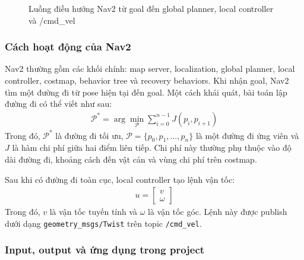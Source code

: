 \begin{figure}[H]
\centering
{}
\caption{Luồng điều hướng Nav2 từ goal đến global planner, local controller và /cmd\_vel}
\label{fig:nav2-flow}
\end{figure}

\subsubsection{Cách hoạt động của Nav2}

Nav2 thường gồm các khối chính: map server, localization, global
planner, local controller, costmap, behavior tree và recovery behaviors.
Khi nhận goal, Nav2 tìm một đường đi từ pose hiện tại đến goal. Một cách
khái quát, bài toán lập đường đi có thể viết như sau:
\begin{gather*}\mathcal{P}^{*} = \arg\min_{\mathcal{P}}\sum_{i = 0}^{n - 1}J\left( p_{i},p_{i + 1} \right)\end{gather*}
Trong đó, \(\mathcal{P}^{*}\) là đường đi tối ưu,
\(\mathcal{P} = \{p_{0},p_{1},\ldots,p_{n}\}\) là một đường đi ứng viên
và \(J\) là hàm chi phí giữa hai điểm liên tiếp. Chi phí này thường phụ
thuộc vào độ dài đường đi, khoảng cách đến vật cản và vùng chi phí trên
costmap.

Sau khi có đường đi toàn cục, local controller tạo lệnh vận tốc:
\begin{gather*}u = \begin{bmatrix}
v \\
\omega
\end{bmatrix}\end{gather*}
Trong đó, \(v\) là vận tốc tuyến tính và \(\omega\) là vận tốc
góc. Lệnh này được publish dưới dạng \texttt{geometry\_msgs/Twist} trên topic
\texttt{/cmd\_vel}.

\subsubsection{Input, output và ứng dụng trong project}

